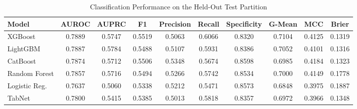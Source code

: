 \begin{table}
\centering
\caption{Classification Performance on the Held-Out Test Partition}
\label{tab:results}
\begin{tabular}{lccccccccc}
\toprule
Model & AUROC & AUPRC & F1 & Precision & Recall & Specificity & G-Mean & MCC & Brier \\
\midrule
XGBoost & 0.7889 & 0.5747 & 0.5519 & 0.5063 & 0.6066 & 0.8320 & 0.7104 & 0.4125 & 0.1319 \\
LightGBM & 0.7887 & 0.5784 & 0.5488 & 0.5107 & 0.5931 & 0.8386 & 0.7052 & 0.4101 & 0.1316 \\
CatBoost & 0.7874 & 0.5712 & 0.5506 & 0.5348 & 0.5674 & 0.8598 & 0.6985 & 0.4184 & 0.1323 \\
Random Forest & 0.7857 & 0.5716 & 0.5494 & 0.5266 & 0.5742 & 0.8534 & 0.7000 & 0.4149 & 0.1778 \\
Logistic Reg. & 0.7637 & 0.5060 & 0.5338 & 0.5212 & 0.5471 & 0.8573 & 0.6848 & 0.3975 & 0.1887 \\
TabNet & 0.7800 & 0.5415 & 0.5385 & 0.5013 & 0.5818 & 0.8357 & 0.6972 & 0.3966 & 0.1348 \\
\bottomrule
\end{tabular}
\end{table}
